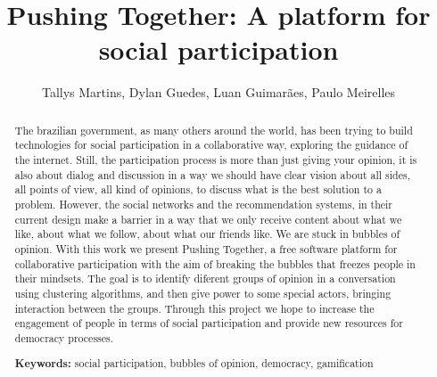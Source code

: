 \documentclass{llncs}
\begin{document}
\sloppy
\title{Pushing Together: A platform for social participation}

\author{Tallys Martins, Dylan Guedes,
        Luan Guimarães, Paulo Meirelles}


\maketitle
\begin{abstract}
  The brazilian government, as many others around the world, has been trying to
  build technologies for social participation in a collaborative way, exploring
  the guidance of the internet.
  Still, the participation process is more than just giving your opinion, it is
  also about dialog and discussion in a way we should have clear vision about all sides,
  all points of view, all kind of opinions, to discuss what is the best solution
  to a problem. However, the social networks and the recommendation systems, in their
  current design make a barrier in a way that we only receive content about
  what we like, about what we follow, about what our friends like. We are 
  stuck in bubbles of opinion.
  With this work we present Pushing Together, a free software platform
  for collaborative participation with the aim of breaking the bubbles that
  freezes people in their mindsets. The goal is to identify diferent groups of
  opinion in a conversation using clustering algorithms, and then give power to some
  special actors, bringing interaction between the groups.
  Through this project we hope to increase the engagement of people in terms of
  social participation and provide new resources for democracy processes.

\textbf{Keywords:} social participation, bubbles of opinion, democracy, gamification
\end{abstract}
\end{document}
